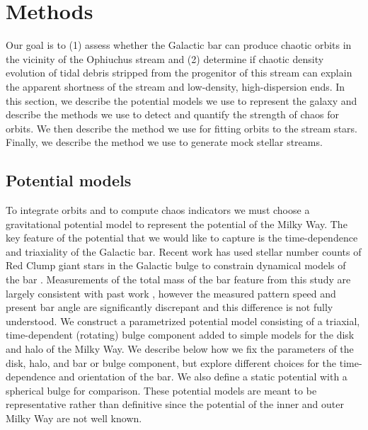 \documentclass[letterpaper,12pt,preprint]{aastex}
\begin{document}
\section{Methods}\label{sec:method}

Our goal is to (1) assess whether the Galactic bar can produce chaotic orbits in the vicinity of the Ophiuchus stream and (2) determine if chaotic density evolution of tidal debris stripped from the progenitor of this stream can explain the apparent shortness of the stream and low-density, high-dispersion ends. In this section, we describe the potential models we use to represent the galaxy and describe the methods we use to detect and quantify the strength of chaos for orbits. We then describe the method we use for fitting orbits to the stream stars. Finally, we describe the method we use to generate mock stellar streams. 

\subsection{Potential models}\label{sec:potential}

To integrate orbits and to compute chaos indicators we must choose a gravitational potential model to represent the potential of the Milky Way. The key feature of the potential that we would like to capture is the time-dependence and triaxiality of the Galactic bar. Recent work has used stellar number counts of Red Clump giant stars in the Galactic bulge to constrain dynamical models of the bar \citep{portail15}. Measurements of the total mass of the bar feature from this study are largely consistent with past work \citep[e.g.,][]{wang12, XX}, however the measured pattern speed and present bar angle are significantly discrepant and this difference is not fully understood. We construct a parametrized potential model consisting of a triaxial, time-dependent (rotating) bulge component added to simple models for the disk and halo of the Milky Way. We describe below how we fix the parameters of the disk, halo, and bar or bulge component, but explore different choices for the time-dependence and orientation of the bar. We also define a static potential with a spherical bulge for comparison. These potential models are meant to be representative rather than definitive since the potential of the inner and outer Milky Way are not well known. 
\end{document}
